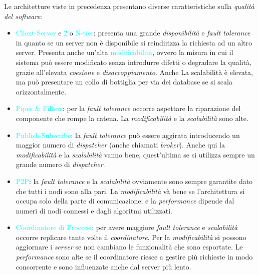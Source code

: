 Le architetture viste in precedenza presentano diverse caratteristiche sulla \emph{qualità del software}:
\begin{itemize}
    \item \textcolor{cyan}{Client-Server} e \textcolor{cyan}{2} o \textcolor{cyan}{N-tier}: presenta una grande \emph{disponibilità} e \emph{fault tolerance} in quanto
        se un server non è disponibile si reindirizza la richiesta ad un altro server. Presenta anche un'alta
        \textcolor{cyan}{modificabilità}, ovvero la misura in cui il sistema può essere modificato senza introdurre difetti o degradare la qualità, grazie all'elevata \emph{coesione}
        e \emph{disaccoppiamento}. Anche La scalabilità è elevata, ma può presentare un collo di bottiglia per via dei database se si scala orizzontalmente.
    \item \textcolor{cyan}{Pipes \& Filters}: per la \emph{fault tolerance} occorre aspettare la riparazione del componente che rompe la catena. La \emph{modificabilità} e
        la \emph{scalabilità} sono alte.
    \item \textcolor{cyan}{Publish-Subscribe}: la \emph{fault tolerance} può essere aggirata introducendo un maggior numero di
        \emph{dispatcher} (anche chiamati \emph{broker}). Anche qui la \emph{modificabilità} e la \emph{scalabilità} vanno bene, quest'ultima
        se si utilizza sempre un grande numero di \emph{dispatcher}.
    \item \textcolor{cyan}{P2P}: la \emph{fault tolerance} e la \emph{scalabilità} ovviamente sono sempre garantite dato che tutti i nodi sono alla pari. La \emph{modificabilità}
        và bene se l'architettura si occupa solo della parte di comunicazione; e la \emph{performance} dipende dal numeri di nodi connessi e dagli algoritmi utilizzati.
    \item \textcolor{cyan}{Coordinatore di Processi}: per avere maggiore \emph{fault tolerance} e \emph{scalabilità} occorre replicare tante volte il \emph{coordinatore}. Per la \emph{modificabilità} si possono
        aggiornare i \emph{server} se non cambiano le funzionalità che sono esportate. Le \emph{performance} sono alte se il coordinatore riesce a gestire più richieste in modo concorrente e sono
        influenzate anche dal server più lento.
\end{itemize}
